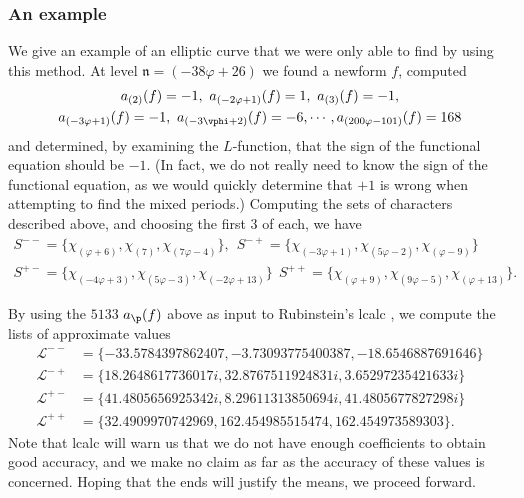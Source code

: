 \documentclass{amsart}
\newcommand{\n}{\mathfrak{n}}
\begin{document}
\subsubsection{An example}
We give an example of an elliptic curve that we were only able to find by using
this method. At level $\n = (-38\varphi + 26)$ we found a newform $f$, computed
\begin{multline*}
    a_{(2)}(f) = -1,\  a_{(-2\varphi + 1)}(f) = 1,\  a_{(3)}(f) = -1, \\ 
    a_{(-3\varphi + 1)}(f) = -1,\  a_{(-3\vphi + 2)}(f) = -6, \cdots, a_{(200\varphi - 101)}(f) = 168
\end{multline*}
and determined, by examining the $L$-function, that the sign of the functional equation
should be $-1$. (In fact, we do not really need to know the sign of the functional equation,
as we would quickly determine that $+1$ is wrong when attempting to find the mixed periods.)
Computing the sets of characters described above, and choosing the first $3$ of each, we
have
\begin{multline*}
S^{--} = \{\chi_{(\varphi + 6)}, \chi_{(7)}, \chi_{(7\varphi - 4)}\}, \ \ 
    S^{-+} = \{\chi_{(-3\varphi + 1)}, \chi_{(5 \varphi - 2)}, \chi_{(\varphi - 9)}\} \\
S^{+-} = \{\chi_{(-4\varphi + 3)}, \chi_{(5\varphi - 3)}, \chi_{(-2\varphi + 13)} \} \ \ 
    S^{++} = \{\chi_{(\varphi + 9)}, \chi_{(9\varphi - 5)}, \chi_{(\varphi + 13)} \}.
\end{multline*}

By using the $5133$ $a_{\p}(f)$ above as input to Rubinstein's lcalc \cite{lcalc}, we compute the
lists of approximate values
\[
\begin{split}
\mathcal{L}^{--} &= \{-33.5784397862407, -3.73093775400387, -18.6546887691646 \} \\ 
\mathcal{L}^{-+} &= \{18.2648617736017i, 32.8767511924831i, 3.65297235421633i \} \\
\mathcal{L}^{+-} &= \{41.4805656925342i, 8.29611313850694i, 41.4805677827298i\} \\
\mathcal{L}^{++} &= \{32.4909970742969, 162.454985515474, 162.454973589303\}.
\end{split}
\]
Note that lcalc will warn us that we do not have enough coefficients to obtain good
accuracy, and we make no claim as far as the accuracy of these values is concerned.
Hoping that the ends will justify the means, we proceed forward.
\end{document}
